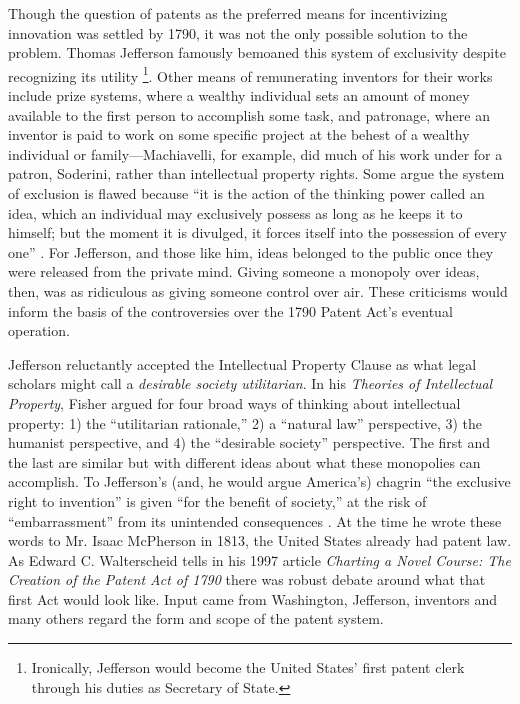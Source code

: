 \documentclass[pdftex,11pt,letterpaper]{article}
\begin{document}
Though the question of patents as the preferred means for incentivizing innovation was settled by 1790, it was not the only possible solution to the problem. Thomas Jefferson famously bemoaned this system of exclusivity despite recognizing its utility \autocite{Jefferson1813}\footnote{Ironically, Jefferson would become the United States' first patent clerk through his duties as Secretary of State.}. Other means of remunerating inventors for their works include prize systems, where a wealthy individual sets an amount of money available to the first person to accomplish some task, and patronage, where an inventor is paid to work on some specific project at the behest of a wealthy individual or family---Machiavelli, for example, did much of his work under for a patron, Soderini, rather than intellectual property rights. Some argue the system of exclusion is flawed because ``it is the action of the thinking power called an idea, which an individual may exclusively possess as long as he keeps it to himself; but the moment it is divulged, it forces itself into the possession of every one'' \autocite{Jefferson1813}. For Jefferson, and those like him, ideas belonged to the public once they were released from the private mind. Giving someone a monopoly over ideas, then, was as ridiculous as giving someone control over air. These criticisms would inform the basis of the controversies over the 1790 Patent Act's eventual operation.

Jefferson reluctantly accepted the Intellectual Property Clause as what legal scholars might call a \emph{desirable society utilitarian}. In his \emph{Theories of Intellectual Property}, Fisher argued for four broad ways of thinking about intellectual property: 1) the ``utilitarian rationale,'' 2) a ``natural law'' perspective, 3) the humanist perspective, and 4) the ``desirable society'' perspective. The first and the last are similar but with different ideas about what these monopolies can accomplish. To Jefferson's (and, he would argue America's) chagrin ``the exclusive right to invention'' is given ``for the benefit of society,'' at the risk of ``embarrassment'' from its unintended consequences \autocite{Jefferson1813}. At the time he wrote these words to Mr. Isaac McPherson in 1813, the United States already had patent law. As Edward C. Walterscheid tells in his 1997 article \emph{Charting a Novel Course: The Creation of the Patent Act of 1790} there was robust debate around what that first Act would look like. Input came from Washington, Jefferson, inventors and many others regard the form and scope of the patent system.
\end{document}
